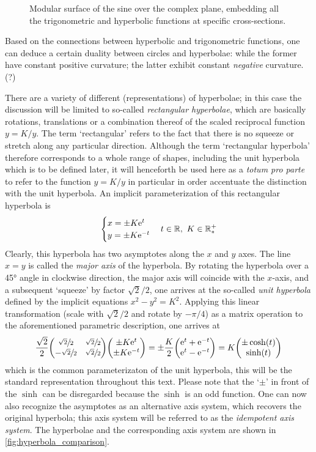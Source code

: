 \begin{figure}[h]
    \centering
    
    \caption{Modular surface of the sine over the complex plane, embedding all the trigonometric and hyperbolic functions at specific cross-sections.}
    \label{fig:modular_sine}
\end{figure}

Based on the connections between hyperbolic and trigonometric functions, one can deduce a certain duality between circles and hyperbolae: while the former have constant positive curvature; the latter exhibit constant \emph{negative} curvature.(?)

There are a variety of different (representations) of hyperbolae; in this case the discussion will be limited to so-called \emph{rectangular hyperbolae}, which are basically rotations, translations or a combination thereof of the scaled reciprocal function $y = K/y$. The term `rectangular' refers to the fact that there is no squeeze or stretch along any particular direction. Although the term `rectangular hyperbola' therefore corresponds to a whole range of shapes, including the unit hyperbola which is to be defined later, it will henceforth be used here as a \emph{totum pro parte} to refer to the function $y = K/y$ in particular in order accentuate the distinction with the unit hyperbola. An implicit parameterization of this rectangular hyperbola is 
$$ 
    \begin{cases}
        x =  \pm K\mathrm{e}^t\\
        y = \pm K\mathrm{e}^{-t}\\
    \end{cases} t \in \mathbb{R},\ K \in \mathbb{R}^+_*
$$
Clearly, this hyperbola has two asymptotes along the $x$ and $y$ axes. The line $x = y$ is called the \emph{major axis} of the hyperbola. By rotating the hyperbola over a \ang{45} angle in clockwise direction, the major axis will coincide with the $x$-axis, and a subsequent `squeeze' by factor $\sqrt{2}/2$, one arrives at the so-called \emph{unit hyperbola} defined by the implicit equations $x^2 - y^2 = K^2$. Applying this linear transformation (scale with $\sqrt{2}/2$ and rotate by $-\pi/4$) as a matrix operation to the aforementioned parametric description, one arrives at 
$$
  \frac{\sqrt{2}}{2}\mqty(\sfrac{\sqrt{2}}{2} & \sfrac{\sqrt{2}}{2} \\ -\sfrac{\sqrt{2}}{2} & \sfrac{\sqrt{2}}{2})\mqty(\pm K\ec^t\\\pm K\ec^{-t}) 
  = \pm\frac{K}{2}\mqty(\ec^t + \ec^{-t}\\ \ec^{t} - \ec^{-t}) 
  = K\mqty(\pm \cosh(t)\\\sinh(t))
$$
which is the common parameterizaton of the unit hyperbola, this will be the standard representation throughout this text. Please note that the `$\pm$' in front of the $\sinh$ can be disregarded because the $\sinh$ is an odd function. One can now also recognize the asymptotes as an alternative axis system, which recovers the original hyperbola; this axis system will be referred to as the \emph{idempotent axis system}. The hyperbolae and the corresponding axis system are shown in \cref{fig:hyperbola_comparison}.

